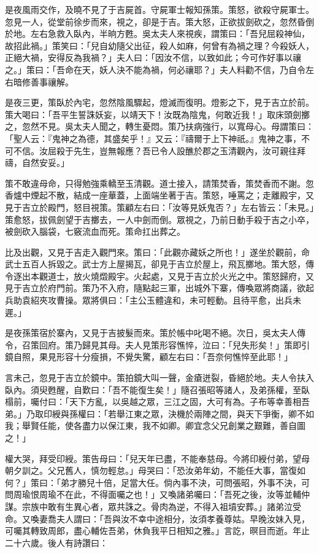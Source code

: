是夜風雨交作，及曉不見了于吉屍首。守屍軍士報知孫策。策怒，欲殺守屍軍士。忽見一人，從堂前徐步而來，視之，卻是于吉。策大怒，正欲拔劍砍之，忽然昏倒於地。左右急救入臥內，半晌方甦。吳太夫人來視疾，謂策曰：「吾兒屈殺神仙，故招此禍。」策笑曰：「兒自幼隨父出征，殺人如麻，何曾有為禍之理？今殺妖人，正絕大禍，安得反為我禍？」夫人曰：「因汝不信，以致如此；今可作好事以禳之。」策曰：「吾命在天，妖人決不能為禍，何必禳耶？」夫人料勸不信，乃自令左右暗修善事禳解。

是夜三更，策臥於內宅，忽然陰風驟起，燈滅而復明。燈影之下，見于吉立於前。策大喝曰：「吾平生誓誅妖妄，以靖天下！汝既為陰鬼，何敢近我！」取床頭劍擲之，忽然不見。吳太夫人聞之，轉生憂悶。策乃扶病強行，以寬母心。母謂策曰：「聖人云：『鬼神之為德，其盛矣乎！』又云：『禱爾于上下神祇。』鬼神之事，不可不信。汝屈殺于先生，豈無報應？吾已令人設醮於郡之玉清觀內，汝可親往拜禱，自然安妥。」

策不敢違母命，只得勉強乘轎至玉清觀。道士接入，請策焚香，策焚香而不謝。忽香爐中煙起不散，結成一座華蓋，上面端坐著于吉。策怒，唾罵之；走離殿宇，又見于吉立於殿門，怒目視策。策顧左右曰：「汝等見妖鬼否？」左右皆云：「未見。」策愈怒，拔佩劍望于吉擲去，一人中劍而倒。眾視之，乃前日動手殺于吉之小卒，被劍砍入腦袋，七竅流血而死。策命扛出葬之。

比及出觀，又見于吉走入觀門來。策曰：「此觀亦藏妖之所也！」遂坐於觀前，命武士五百人拆毀之。武士方上屋揭瓦，卻見于吉立於屋上，飛瓦擲地。策大怒，傳令逐出本觀道士，放火燒燬殿宇。火起處，又見于吉立於火光之中。策怒歸府，又見于吉立於府門前。策乃不入府，隨點起三軍，出城外下寨，傳喚眾將商議，欲起兵助袁紹夾攻曹操。眾將俱曰：「主公玉體違和，未可輕動。且待平愈，出兵未遲。」

是夜孫策宿於寨內，又見于吉披髮而來。策於帳中叱喝不絕。次日，吳太夫人傳令，召策回府。策乃歸見其母。夫人見策形容憔悴，泣曰：「兒失形矣！」策即引鏡自照，果見形容十分瘦損，不覺失驚，顧左右曰：「吾奈何憔悴至此耶！」

言未己，忽見于吉立於鏡中。策拍鏡大叫一聲，金瘡迸裂，昏絕於地。夫人令扶入臥內。須臾甦醒，自歎曰：「吾不能復生矣！」隨召張昭等諸人，及弟孫權，至臥榻前，囑付曰：「天下方亂，以吳越之眾，三江之固，大可有為。子布等幸善相吾弟。」乃取印綬與孫權曰：「若舉江東之眾，決機於兩陣之間，與天下爭衡，卿不如我；舉賢任能，使各盡力以保江東，我不如卿。卿宜念父兄創業之艱難，善自圖之！」

權大哭，拜受印綬。策告母曰：「兒天年已盡，不能奉慈母。今將印綬付弟，望母朝夕訓之。父兄舊人，慎勿輕怠。」母哭曰：「恐汝弟年幼，不能任大事，當復如何？」策曰：「弟才勝兒十倍，足當大任。倘內事不決，可問張昭，外事不決，可問周瑜恨周瑜不在此，不得面囑之也！」又喚諸弟囑曰：「吾死之後，汝等並輔仲謀。宗族中敢有生異心者，眾共誅之。骨肉為逆，不得入祖墳安葬。」諸弟泣受命。又喚妻喬夫人謂曰：「吾與汝不幸中途相分，汝須孝養尊姑。早晚汝妹入見，可囑其轉致周郎，盡心輔佐吾弟，休負我平日相知之雅。」言訖，暝目而逝。年止二十六歲。後人有詩讚曰：

